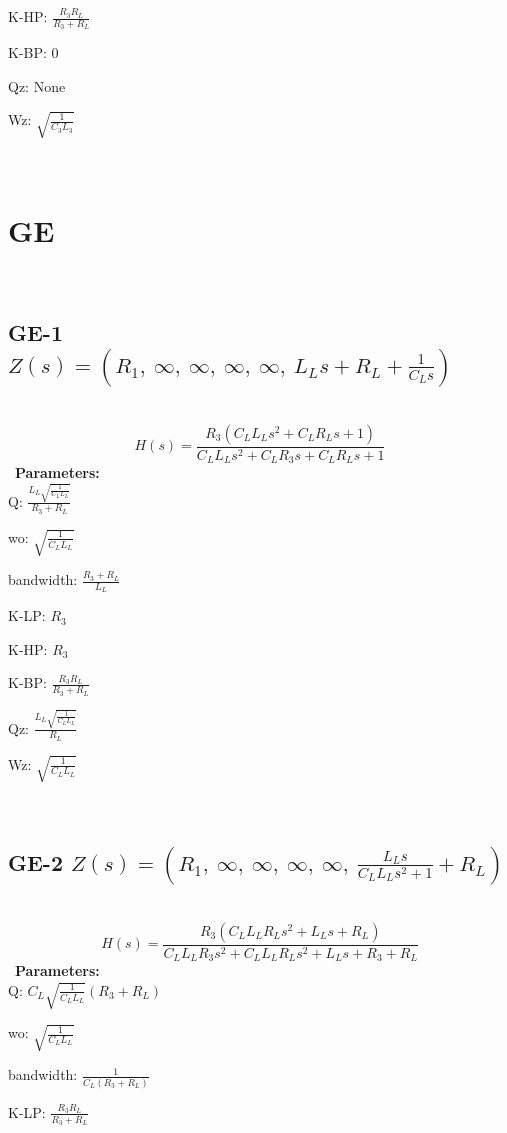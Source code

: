 \documentclass{article}
\begin{document}
K-HP: $\frac{R_{3} R_{L}}{R_{3} + R_{L}}$\ 

K-BP: $0$\ 

Qz: $\text{None}$\ 

Wz: $\sqrt{\frac{1}{C_{3} L_{3}}}$\ 

\ 

\section{GE}\ 
\subsection{GE-1 $Z(s) = \left( R_{1}, \  \infty, \  \infty, \  \infty, \  \infty, \  L_{L} s + R_{L} + \frac{1}{C_{L} s}\right)$ } \ 
\textbf{\[H(s) = \frac{R_{3} \left(C_{L} L_{L} s^{2} + C_{L} R_{L} s + 1\right)}{C_{L} L_{L} s^{2} + C_{L} R_{3} s + C_{L} R_{L} s + 1}\] } \ 
\textbf{Parameters:}\\ 

Q: $\frac{L_{L} \sqrt{\frac{1}{C_{L} L_{L}}}}{R_{3} + R_{L}}$\ 

wo: $\sqrt{\frac{1}{C_{L} L_{L}}}$\ 

bandwidth: $\frac{R_{3} + R_{L}}{L_{L}}$\ 

K-LP: $R_{3}$\ 

K-HP: $R_{3}$\ 

K-BP: $\frac{R_{3} R_{L}}{R_{3} + R_{L}}$\ 

Qz: $\frac{L_{L} \sqrt{\frac{1}{C_{L} L_{L}}}}{R_{L}}$\ 

Wz: $\sqrt{\frac{1}{C_{L} L_{L}}}$\ 

\ 

\subsection{GE-2 $Z(s) = \left( R_{1}, \  \infty, \  \infty, \  \infty, \  \infty, \  \frac{L_{L} s}{C_{L} L_{L} s^{2} + 1} + R_{L}\right)$ } \ 
\textbf{\[H(s) = \frac{R_{3} \left(C_{L} L_{L} R_{L} s^{2} + L_{L} s + R_{L}\right)}{C_{L} L_{L} R_{3} s^{2} + C_{L} L_{L} R_{L} s^{2} + L_{L} s + R_{3} + R_{L}}\] } \ 
\textbf{Parameters:}\\ 

Q: $C_{L} \sqrt{\frac{1}{C_{L} L_{L}}} \left(R_{3} + R_{L}\right)$\ 

wo: $\sqrt{\frac{1}{C_{L} L_{L}}}$\ 

bandwidth: $\frac{1}{C_{L} \left(R_{3} + R_{L}\right)}$\ 

K-LP: $\frac{R_{3} R_{L}}{R_{3} + R_{L}}$\ 
\end{document}
